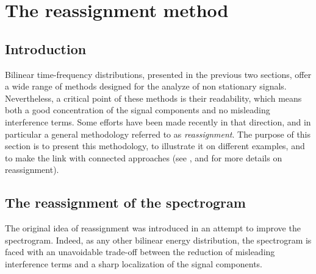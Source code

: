 
\section{The reassignment method}
\subsection{Introduction}

  Bilinear time-frequency distributions, presented in the previous two
sections, offer a wide range of methods designed for the analyze of non
stationary signals. Nevertheless, a critical point of these methods is
their readability, which means both a good concentration of the signal
components and no misleading interference terms. Some efforts have been
made recently in that direction, and in particular a general methodology
referred to as {\it reassignment}. The purpose of this section is to
present this methodology, to illustrate it on different examples, and to
make the link with connected approaches (see \cite{AUG94}, \cite{KOD76} and
\cite{AUG95} for more details on reassignment).


\subsection{The reassignment of the spectrogram}

  The original idea of reassignment was introduced in an attempt to
improve the spectrogram. Indeed, as any other bilinear energy
distribution, the spectrogram is faced with an unavoidable trade-off
between the reduction of misleading interference terms and a sharp
localization of the signal components.

